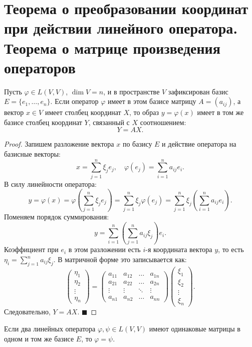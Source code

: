 \section{Теорема о преобразовании координат при действии линейного оператора. Теорема о матрице произведения операторов}

\begin{theorem}
Пусть $\varphi \in L(V, V)$, $\dim V = n$, и в пространстве $V$ зафиксирован базис $E = \{e_1, \dots, e_n\}$. Если оператор $\varphi$ имеет в этом базисе матрицу $A = (a_{ij})$, а вектор $x \in V$ имеет столбец координат $X$, то образ $y = \varphi(x)$ имеет в том же базисе столбец координат $Y$, связанный с $X$ соотношением:
\[
Y = A X.
\]
\end{theorem}

\begin{proof}
Запишем разложение вектора $x$ по базису $E$ и действие оператора на базисные векторы:
\[
x = \sum_{j=1}^n \xi_j e_j, \quad \varphi(e_j) = \sum_{i=1}^n a_{ij} e_i.
\]
В силу линейности оператора:
\[
y = \varphi(x) = \varphi\left(\sum_{j=1}^n \xi_j e_j\right) = \sum_{j=1}^n \xi_j \varphi(e_j) = \sum_{j=1}^n \xi_j \left( \sum_{i=1}^n a_{ij} e_i \right).
\]
Поменяем порядок суммирования:
\[
y = \sum_{i=1}^n \left( \sum_{j=1}^n a_{ij} \xi_j \right) e_i.
\]
Коэффициент при $e_i$ в этом разложении есть $i$-я координата вектора $y$, то есть $\eta_i = \sum_{j=1}^n a_{ij} \xi_j$. В матричной форме это записывается как:
\[
\begin{pmatrix} \eta_1 \\ \eta_2 \\ \vdots \\ \eta_n \end{pmatrix} = 
\begin{pmatrix}
a_{11} & a_{12} & \dots & a_{1n} \\
a_{21} & a_{22} & \dots & a_{2n} \\
\vdots & \vdots & \ddots & \vdots \\
a_{n1} & a_{n2} & \dots & a_{nn}
\end{pmatrix}
\begin{pmatrix} \xi_1 \\ \xi_2 \\ \vdots \\ \xi_n \end{pmatrix}.
\]
Следовательно, $Y = A X$.
\hfill$\blacksquare$
\end{proof}

\begin{lemma}
Если два линейных оператора $\varphi, \psi \in L(V, V)$ имеют одинаковые матрицы в одном и том же базисе $E$, то $\varphi = \psi$.
\end{lemma}

